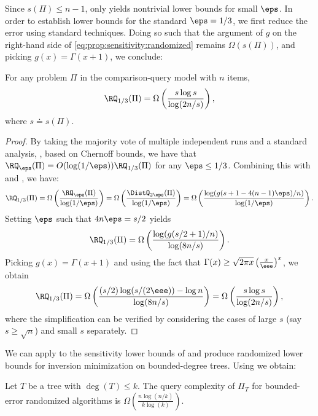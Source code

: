 Since $s(\Pi) \le n-1$,  only yields nontrivial lower bounds for small $\eps$. In order to establish lower bounds for the standard $\eps=1/3$, we first reduce the error using standard techniques. Doing so such that the argument of $g$ on the right-hand side of \eqref{eq:prop:sensitivity:randomized} remains $\Omega(s(\Pi))$, and picking $g(x)=\Gamma(x+1)$, we conclude:

\begin{lemma}
\label{lemma:randomized-sensitivity}
For any problem $\Pi$ in the comparison-query model with $n$ items, 
\[\RQ_{1/3}(\Pi) = \Omega \left(\frac{s \log s}{\log(2n/s)} \right), \]
where $s \doteq s(\Pi)$.
\end{lemma}

\begin{proof}
By taking the majority vote of multiple independent runs and a standard analysis, \eg, based on Chernoff bounds, we have that $\RQ_\eps(\Pi) = O(\log(1/\eps)) \RQ_{1/3}(\Pi)$ for any $\eps \le 1/3$. Combining this with  and , we have:
\[\RQ_{1/3}(\Pi) = \Omega \left( \frac{\RQ_{\eps}(\Pi)}{\log(1/\eps)} \right) = \Omega \left(  \frac{\DistQ_{2\eps}(\Pi)}{\log(1/\eps)} \right) =  \Omega \left( \frac{\log(g(s+1-4(n-1)\eps)/n)}{\log(1/\eps)}\right). \]
Setting $\eps$ such that $4n\eps = s/2$ yields
\[\RQ_{1/3}(\Pi) =  \Omega \left( \frac{\log(g(s/2+1)/n)}{\log(8n/s)}\right).
\]
Picking $g(x)=\Gamma(x+1)$ and using the fact that $\Gamma(x) \ge \sqrt{2\pi x} \left(\frac{x}{\eee}\right)^x$, %
we obtain
\[\RQ_{1/3}(\Pi) =  \Omega \left( \frac{(s/2)\log(s/(2\eee)) - \log n}{\log(8n/s)}\right) = \Omega \left( \frac{s\log s }{\log(2n/s)}\right),
\]
where the simplification can be verified by considering the cases of large $s$ (say $s \ge \sqrt{n}$) and small $s$ separately. 
\end{proof}

We can apply  to the sensitivity lower bounds of  and produce randomized lower bounds for inversion minimization on bounded-degree trees. Using  we obtain: 

\begin{theorem}
	Let $T$ be a tree with $\deg(T)\le k$. The query complexity of $\Pi_T$ for bounded-error randomized algorithms is $\Omega(\frac{n\log(n/k)}{k\log(k)})$.
\end{theorem}



